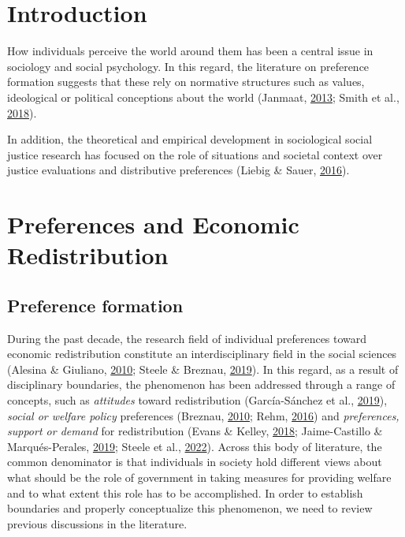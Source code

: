 \documentclass[
  12pt,
]{book}
\begin{document}
\hypertarget{introduction}{%
\chapter{Introduction}\label{introduction}}

How individuals perceive the world around them has been a central issue in sociology and social psychology. In this regard, the literature on preference formation suggests that these rely on normative structures such as values, ideological or political conceptions about the world (Janmaat, \protect\hyperlink{ref-Janmaat2013}{2013}; Smith et al., \protect\hyperlink{ref-smithCulturalValuesModerate2018}{2018}).

In addition, the theoretical and empirical development in sociological social justice research has focused on the role of situations and societal context over justice evaluations and distributive preferences (Liebig \& Sauer, \protect\hyperlink{ref-Liebig-Sauer2016}{2016}).

\hypertarget{preferences-and-economic-redistribution}{%
\chapter{Preferences and Economic Redistribution}\label{preferences-and-economic-redistribution}}

\hypertarget{preference-formation}{%
\section{Preference formation}\label{preference-formation}}

During the past decade, the research field of individual preferences toward economic redistribution constitute an interdisciplinary field in the social sciences (Alesina \& Giuliano, \protect\hyperlink{ref-alesina_preferences_2010}{2010}; Steele \& Breznau, \protect\hyperlink{ref-steele_attitudes_2019}{2019}). In this regard, as a result of disciplinary boundaries, the phenomenon has been addressed through a range of concepts, such as \emph{attitudes} toward redistribution (García-Sánchez et al., \protect\hyperlink{ref-Garcia-Sanchez19}{2019}), \emph{social or welfare policy} preferences (Breznau, \protect\hyperlink{ref-breznau_economic_2010}{2010}; Rehm, \protect\hyperlink{ref-rehm_risk_2016}{2016}) and \emph{preferences, support or demand} for redistribution (Evans \& Kelley, \protect\hyperlink{ref-evans_strong_2018}{2018}; Jaime-Castillo \& Marqués-Perales, \protect\hyperlink{ref-jaime-castillo_social_2019}{2019}; Steele et al., \protect\hyperlink{ref-steele_wealth_2022}{2022}). Across this body of literature, the common denominator is that individuals in society hold different views about what should be the role of government in taking measures for providing welfare and to what extent this role has to be accomplished. In order to establish boundaries and properly conceptualize this phenomenon, we need to review previous discussions in the literature.
\end{document}
